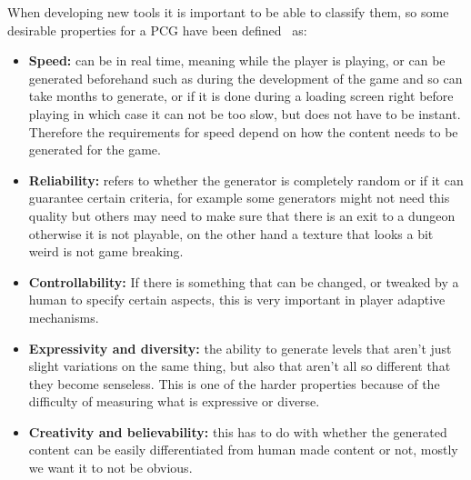 \documentclass[runningheads]{llncs}
\begin{document}
When developing new tools it is important to be able to classify them, so some desirable properties for a PCG have been defined~\cite{ref_togelius} as:
\begin{itemize}
    \item\textbf{Speed:} can be in real time, meaning while the player is playing, or can be generated beforehand such as during the development of the game and so can take months to generate, or if it is done during a loading screen right before playing in which case it can not be too slow, but does not have to be instant. Therefore the requirements for speed depend on how the content needs to be generated for the game.
    
    \item\textbf{Reliability:} refers to whether the generator is completely random or if it can guarantee certain criteria, for example some generators might not need this quality but others may need to make sure that there is an exit to a dungeon otherwise it is not playable, on the other hand a texture that looks a bit weird is not game breaking.
    
    \item\textbf{Controllability:} If there is something that can be changed, or tweaked by a human to specify certain aspects, this is very important in player adaptive mechanisms. 
    
    \item\textbf{Expressivity and diversity:} the ability to generate levels that aren’t just slight variations on the same thing, but also that aren’t all so different that they become senseless. This is one of the harder properties because of the difficulty of measuring what is expressive or diverse.
    
    \item\textbf{Creativity and believability:} this has to do with whether the generated content can be easily differentiated from human made content or not, mostly we want it to not be obvious.
\end{itemize}
\end{document}
